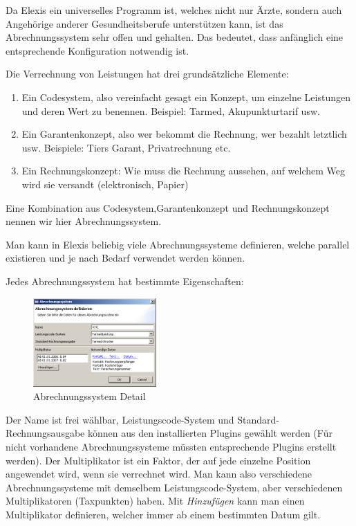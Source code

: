 Da Elexis ein universelles Programm ist, welches nicht nur Ärzte, sondern auch Angehörige anderer Gesundheitsberufe unterstützen kann, ist das Abrechnungssystem sehr offen und gehalten. Das bedeutet, dass anfänglich eine entsprechende Konfiguration notwendig ist.

Die Verrechnung von Leistungen hat drei grundsätzliche Elemente:
\begin{enumerate}
    \item Ein Codesystem, also vereinfacht gesagt ein Konzept, um einzelne Leistungen und deren Wert zu benennen. Beispiel: \glqq Tarmed\grqq{}, \glqq Akupunkturtarif\grqq{} usw.
   \item Ein Garantenkonzept, also wer bekommt die Rechnung, wer bezahlt letztlich usw. Beispiele: Tiers Garant, Privatrechnung etc.
   \item Ein Rechnungskonzept: Wie muss die Rechnung aussehen, auf welchem Weg wird sie versandt (elektronisch, Papier)
\end{enumerate}

Eine Kombination aus Codesystem,Garantenkonzept und Rechnungskonzept nennen wir hier \glqq Abrechnungssystem\grqq{}.

Man kann in Elexis beliebig viele Abrechnungssysteme definieren, welche parallel existieren und je nach Bedarf verwendet werden können.

Jedes Abrechnungssystem hat bestimmte Eigenschaften:\\
\begin{figure}
    \includegraphics[width=4.7cm]{images/abrechnungssystem1}
    \caption{Abrechnungssystem Detail}
    \label{fig:abr1}
\end{figure}

Der Name ist frei wählbar, Leistungscode-System und Standard-Rechnungsausgabe können aus den installierten Plugins gewählt werden (Für nicht vorhandene Abrechnungssysteme müssten entsprechende Plugins erstellt werden).
Der Multiplikator ist ein Faktor, der auf jede einzelne Position angewendet wird, wenn sie verrechnet wird. Man kann also verschiedene Abrechnungssysteme mit demselbem Leistungscode-System, aber verschiedenen Multiplikatoren (\glqq Taxpunkten\grqq{}) haben. Mit \textit{Hinzufügen} kann man einen Multiplikator definieren, welcher immer ab einem bestimmten Datum gilt.

